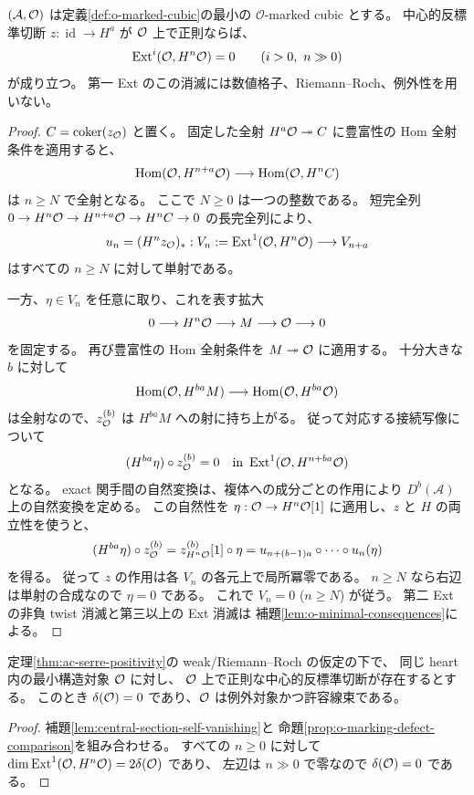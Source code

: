 \begin{lemma}
\label{lem:central-section-self-vanishing}
$(\mathcal A,\mathcal O)$ は定義\ref{def:o-marked-cubic}の最小の
$\mathcal O$-marked cubic とする。
中心的反標準切断 $z:\operatorname{id}\to H^a$ が $\mathcal O$ 上で正則ならば、
\begin{equation}\label{eq:central-section-self-vanishing}
 \operatorname{Ext}^i(\mathcal O,H^n\mathcal O)=0\qquad(i>0,\ n\gg0)
\end{equation}
が成り立つ。
第一 Ext のこの消滅には数値格子、Riemann--Roch、例外性を用いない。
\end{lemma}
\begin{proof}
$C=\operatorname{coker}(z_{\mathcal O})$ と置く。
固定した全射 $H^a\mathcal O\twoheadrightarrow C$ に豊富性の Hom 全射条件を適用すると、
\[
 \operatorname{Hom}(\mathcal O,H^{n+a}\mathcal O)\longrightarrow\operatorname{Hom}(\mathcal O,H^nC)
\]
は $n\ge N$ で全射となる。
ここで $N\ge0$ は一つの整数である。
短完全列 $0\to H^n\mathcal O\to H^{n+a}\mathcal O\to H^nC\to0$ の長完全列により、
\begin{equation}\label{eq:central-section-eventual-injection}
 u_n=(H^nz_{\mathcal O})_*:
 V_n:=\operatorname{Ext}^1(\mathcal O,H^n\mathcal O)\longrightarrow V_{n+a}
\end{equation}
はすべての $n\ge N$ に対して単射である。

一方、$\eta\in V_n$ を任意に取り、これを表す拡大
\[
 0\longrightarrow H^n\mathcal O\longrightarrow M\longrightarrow\mathcal O\longrightarrow0
\]
を固定する。
再び豊富性の Hom 全射条件を $M\twoheadrightarrow\mathcal O$ に適用する。
十分大きな $b$ に対して
\[
 \operatorname{Hom}(\mathcal O,H^{ba}M)\longrightarrow\operatorname{Hom}(\mathcal O,H^{ba}\mathcal O)
\]
は全射なので、$z_{\mathcal O}^{(b)}$ は $H^{ba}M$ への射に持ち上がる。
従って対応する接続写像について
\[
 (H^{ba}\eta)\circ z_{\mathcal O}^{(b)}=0
 \quad\text{in }\operatorname{Ext}^1(\mathcal O,H^{n+ba}\mathcal O)
\]
となる。
exact 関手間の自然変換は、複体への成分ごとの作用により
$D^b(\mathcal A)$ 上の自然変換を定める。
この自然性を $\eta:\mathcal O\to H^n\mathcal O[1]$ に適用し、$z$ と $H$ の両立性を使うと、
\[
 (H^{ba}\eta)\circ z_{\mathcal O}^{(b)}
 =z_{H^n\mathcal O}^{(b)}[1]\circ\eta
 =u_{n+(b-1)a}\circ\cdots\circ u_n(\eta)
\]
を得る。
従って $z$ の作用は各 $V_n$ の各元上で局所冪零である。
$n\ge N$ なら右辺は単射の合成なので $\eta=0$ である。
これで $V_n=0$ ($n\ge N$) が従う。
第二 Ext の非負 twist 消滅と第三以上の Ext 消滅は
補題\ref{lem:o-minimal-consequences}による。
\end{proof}

\begin{corollary}[数値的欠損の消滅]
\label{cor:central-section-exceptionality}
定理\ref{thm:ac-serre-positivity}の weak/Riemann--Roch の仮定の下で、
同じ heart 内の最小構造対象 $\mathcal O$ に対し、
$\mathcal O$ 上で正則な中心的反標準切断が存在するとする。
このとき $\delta(\mathcal O)=0$ であり、$\mathcal O$ は例外対象かつ許容線束である。
\end{corollary}
\begin{proof}
補題\ref{lem:central-section-self-vanishing}と
命題\ref{prop:o-marking-defect-comparison}を組み合わせる。
すべての $n\ge0$ に対して
$\dim\operatorname{Ext}^1(\mathcal O,H^n\mathcal O)=2\delta(\mathcal O)$ であり、
左辺は $n\gg0$ で零なので $\delta(\mathcal O)=0$ である。
\end{proof}

